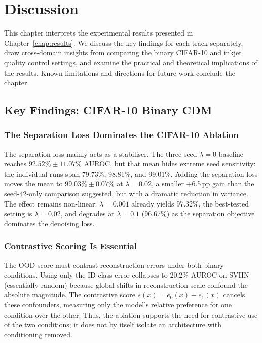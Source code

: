 \cleardoubleoddpage
\chapter{Discussion}
\label{chap:discussion}
\begingroup
\fontsize{11pt}{13.2pt}\selectfont

This chapter interprets the experimental results presented in
Chapter~\ref{chap:results}. We discuss the key findings for each track
separately, draw cross-domain insights from comparing the binary CIFAR-10
and inkjet quality control settings, and examine the practical and
theoretical implications of the results. Known limitations and directions
for future work conclude the chapter.

\section{Key Findings: CIFAR-10 Binary CDM}
\label{sec:disc:cifar}

\subsection{The Separation Loss Dominates the CIFAR-10 Ablation}
\label{sec:disc:cifar:separation}

The separation loss mainly acts as a stabiliser. The three-seed
$\lambda = 0$ baseline reaches $92.52\% \pm 11.07\%$ AUROC, but that
mean hides extreme seed sensitivity: the individual runs span
79.73\%, 98.81\%, and 99.01\%. Adding the separation loss moves the
mean to $99.03\% \pm 0.07\%$ at $\lambda = 0.02$, a smaller
+6.5\,pp gain than the seed-42-only comparison suggested, but with a
dramatic reduction in variance. The effect remains non-linear:
$\lambda = 0.001$ already yields 97.32\%, the best-tested setting is
$\lambda = 0.02$, and degrades at $\lambda = 0.1$ (96.67\%) as the
separation objective dominates the denoising loss.

\subsection{Contrastive Scoring Is Essential}
\label{sec:disc:cifar:contrastive}

The OOD score must contrast reconstruction errors under both binary
conditions. Using only the ID-class error collapses to 20.2\% AUROC on
SVHN (essentially random) because global shifts in reconstruction
scale confound the absolute magnitude. The contrastive score
$s(x) = e_0(x) - e_1(x)$ cancels these confounders, measuring only the
model's relative preference for one condition over the other. Thus, the
ablation supports the need for contrastive use of the two conditions; it
does not by itself isolate an architecture with conditioning removed.

